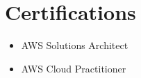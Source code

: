 \documentclass[letterpaper,11pt]{article}
\newcommand{\resumeSubHeadingListStart}{\begin{itemize}[leftmargin=0.0in, label={}]}
\begin{document}
\vspace{-5pt}
  \section{Certifications}
        \begin{multicols}{3}
            \begin{itemize}[itemsep=-5pt, parsep=5pt]
              \item AWS Solutions Architect
              \item AWS Cloud Practitioner
            \end{itemize}
        \end{multicols}
\vspace*{2.0\multicolsep}


\vspace{0pt}
\end{document}
